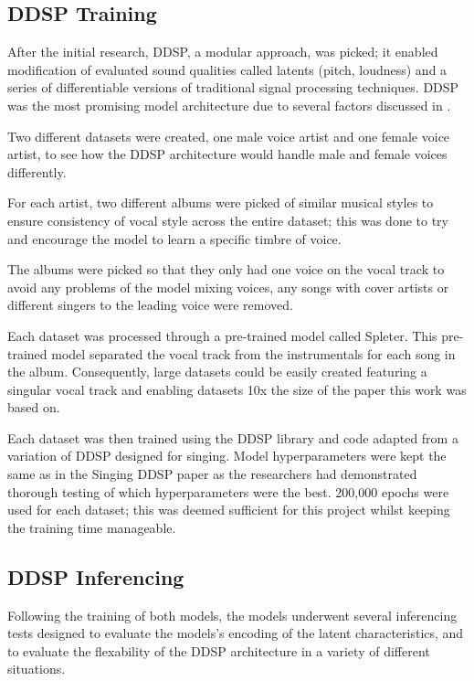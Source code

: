 \subsection{DDSP Training}

After the initial research, DDSP, a modular approach, was picked; it enabled modification of evaluated sound qualities called latents (pitch, loudness) and a series of differentiable versions of traditional signal processing techniques. DDSP was the most promising model architecture due to several factors discussed in .

Two different datasets were created, one male voice artist and one female voice artist, to see how the DDSP architecture would handle male and female voices differently.

For each artist, two different albums were picked of similar musical styles to ensure consistency of vocal style across the entire dataset; this was done to try and encourage the model to learn a specific timbre of voice.

The albums were picked so that they only had one voice on the vocal track to avoid any problems of the model mixing voices, any songs with cover artists or different singers to the leading voice were removed.

Each dataset was processed through a pre-trained model called Spleter\cite{Spleeter}. This pre-trained model separated the vocal track from the instrumentals for each song in the album. Consequently, large datasets could be easily created featuring a singular vocal track and enabling datasets 10x the size of the paper this work was based on\cite{SingingDDSP}.

Each dataset was then trained using the DDSP library\cite{DDSPPip} and code adapted from a variation of DDSP designed for singing\cite{SingingDDSP}. Model hyperparameters were kept the same as in the Singing DDSP paper\cite{SingingDDSP} as the researchers had demonstrated thorough testing of which hyperparameters were the best. 200,000 epochs were used for each dataset; this was deemed sufficient for this project whilst keeping the training time manageable.

\subsection{DDSP Inferencing}

Following the training of both models, the models underwent several inferencing tests designed to evaluate the models's encoding of the latent characteristics, and to evaluate the flexability of the DDSP architecture in a variety of different situations.

